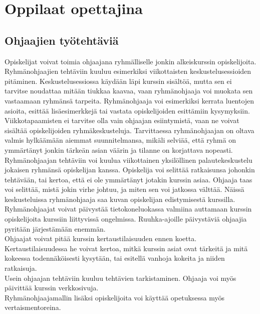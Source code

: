 \documentclass[finnish]{tktltiki2}
\theoremstyle{definition}
\theoremstyle{remark}
\begin{document}
\section{Oppilaat opettajina}

\subsection{Ohjaajien työtehtäviä}
Opiskelijat voivat toimia ohjaajana ryhmälliselle jonkin alkeiskurssin o\-pis\-ke\-li\-joi\-ta\cite{Reges88}. Ryhmänohjaajien tehtäviin kuuluu  esimerkiksi viikottaisten keskustelusessioiden pitäminen. Keskustelusessiossa käydään läpi kurssin sisältöä, mutta sen ei tarvitse noudattaa mitään tiukkaa kaavaa, vaan ryhmänohjaaja voi muokata sen vastaamaan ryhmänsä tarpeita. Ryhmänohjaaja voi esimerkiksi kerrata luentojen asioita, esittää lisäesimerkkejä tai vastata opiskelijoiden esittämiin kysymyksiin. Viikkotapaamisten ei tarvitse olla vain ohjaajan esiintymistä, vaan ne voivat sisältää opiskelijoiden ryhmäkeskusteluja.\cite{Decker06} Tarvittaessa ryhmänohjaajan on oltava valmis hylkäämään aiemmat suunnitelmansa, mikäli selviää, että ryhmä on ymmärtänyt jonkin tärkeän asian väärin ja tilanne on korjattava nopeasti.\cite{Reges88}
\\
Ryhmänohjaajan tehtäviin voi kuulua viikottainen yksilöllinen palautekeskustelu jokaisen ryhmänsä opiskelijan kanssa. Opiskelija voi selittää ratkaisunsa johonkin tehtävään, tai kertoa, että ei ole ymmärtänyt jotakin kurssin asiaa. Ohjaaja taas voi selittää, mistä jokin virhe johtuu, ja miten sen voi jatkossa välttää. Näissä keskusteluissa ryhmänohjaaja saa kuvan opiskelijan edistymisestä kurssilla.\cite{Reges88,Reges03}
\\
Ryhmänohjaajat voivat päivystää tietokoneluokassa valmiina auttamaan kurssin opiskelijoita kurssiin liittyvissä ongelmissa. Ruuhka-ajoille päivystäviä ohjaajia pyritään järjestämään enemmän.\cite{Reges88, Reges03}
\\
Ohjaajat voivat pitää kurssin kertaustilaisuuden ennen koetta. Kertaustilaisuudessa he voivat kertoa, mitkä kurssin asiat ovat tärkeitä ja mitä kokeessa todennäköisesti kysytään, tai esitellä vanhoja kokeita ja niiden ratkaisuja.\cite{Decker06}
\\
Usein ohjaajan tehtäviin kuuluu tehtävien tarkistaminen. Ohjaaja voi myös päivittää kurssin verkkosivuja.\cite{Dickson11}
\\
Ryhmänohjaajamallin lisäksi opiskelijoita voi käyttää opetuksessa myös vertaismentoreina.
\end{document}
